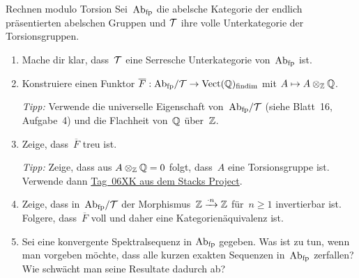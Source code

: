 \documentclass{uebblatt}
\begin{document}

\begin{aufgabe}{Rechnen modulo Torsion}
Sei~$\mathrm{Ab}_\text{fp}$ die abelsche Kategorie der endlich präsentierten abelschen
Gruppen und $\mathcal{T}$ ihre volle Unterkategorie der Torsionsgruppen.
\begin{enumerate}
\item Mache dir klar, dass~$\mathcal{T}$ eine Serresche Unterkategorie
von~$\mathrm{Ab}_\text{fp}$ ist.
\item Konstruiere einen Funktor $\overline{F} : \mathrm{Ab}_\text{fp}/\mathcal{T} \to
\mathrm{Vect}(\mathbb{Q})_\text{findim}$ mit $A \mapsto A \otimes_{\mathbb{Z}} \mathbb{Q}$.

{\tiny\emph{Tipp:} Verwende die universelle Eigenschaft von~$\mathrm{Ab}_\text{fp}/\mathcal{T}$
(siehe Blatt~16, Aufgabe~4) und die Flachheit von~$\mathbb{Q}$ über~$\mathbb{Z}$.\par}

\item Zeige, dass~$\overline{F}$ treu ist.

{\tiny\emph{Tipp:} Zeige, dass aus $A \otimes_{\mathbb{Z}} \mathbb{Q} = 0$ folgt,
dass~$A$ eine Torsionsgruppe ist. Verwende dann
\href{http://stacks.math.columbia.edu/tag/06XK}{Tag~06XK aus dem Stacks
Project}.\par}
\item Zeige, dass in~$\mathrm{Ab}_\text{fp}/\mathcal{T}$ der Morphismus~$\mathbb{Z} \xrightarrow{\cdot
n} \mathbb{Z}$ für~$n \geq 1$ invertierbar ist. Folgere, dass~$\overline{F}$
voll und daher eine Kategorienäquivalenz ist.
\item Sei eine konvergente Spektralsequenz in $\mathrm{Ab}_\text{fp}$ gegeben. Was ist
zu tun, wenn man vorgeben möchte, dass alle kurzen exakten Sequenzen
in~$\mathrm{Ab}_\text{fp}$ zerfallen? Wie schwächt man seine Resultate dadurch ab?
\end{enumerate}
\end{aufgabe}
\end{document}
